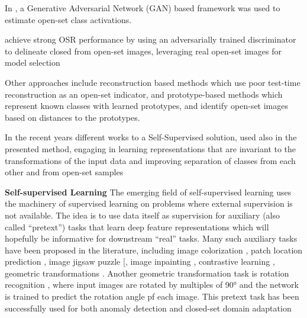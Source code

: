\documentclass[10pt,twocolumn,letterpaper]{article}
\begin{document}
In \cite{ge2017generative}, a Generative Adversarial Network (GAN) based framework was used to estimate
open-set class activations.

\cite{kong2021opengan} achieve strong OSR performance by using an adversarially 
trained discriminator to delineate closed from open-set images,
leveraging real open-set images for model selection

Other approaches include reconstruction based methods 
\cite{yoshihashi2019classificationreconstruction}
which use poor test-time reconstruction as an open-set indicator, 
and prototype-based methods \cite{shu2020podn} 
which represent known classes with learned prototypes, and identify open-set images
based on distances to the prototypes.

In the recent years different works to a Self-Supervised solution, used also in the 
presented method, engaging in learning representations that are invariant to the 
transformations of the input data and improving separation of classes from each other 
and from open-set samples \cite{dhamija2021selfsupervised,jia2021selfsupervised,Perera_2020_CVPR,GeoTran}

\textbf{Self-supervised Learning}
The emerging field of self-supervised learning uses the machinery of supervised 
learning on problems where external supervision is not available. 
The idea is to use data itself as supervision for auxiliary (also called “pretext”) 
tasks that learn deep feature representations which will hopefully be informative 
for downstream “real” tasks.
Many such auxiliary tasks have been proposed in the literature, including
image colorization \cite{zhang2016colorful,larsson2017learning}, patch location 
prediction \cite{doersch2016unsupervised, doersch2017multitask},
image jigsaw puzzle [\cite{noroozi2017unsupervised}, image inpainting \cite{pathak2016context},
contrastive learning \cite{oord2019representation}, geometric transformations \cite{dosovitskiy2015discriminative}. Another geometric 
transformation task is rotation recognition \cite{OldROS}, where input images
are rotated by multiples of 90° and the network is trained to predict the rotation
angle pf each image. This pretext task has been successfully used for both anomaly
detection \cite{golan2018deep} and closed-set domain adaptation \cite{selfsupxu}
\end{document}
